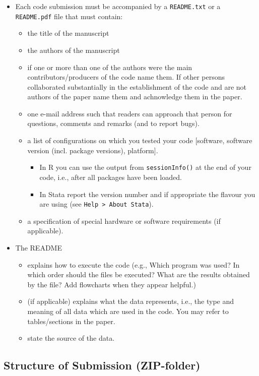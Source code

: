 \documentclass[12pt,a4paper]{article}
\begin{document}
\begin{itemize}
\item Each code submission {must} be accompanied by a \texttt{README.txt} or a
  \texttt{README.pdf} file that must contain:
  \begin{itemize}
  \item the title of the manuscript
  \item the authors of the manuscript
  \item if one or more than one of the authors were the main contributors/producers
    of the code name them. If other persons collaborated substantially in the
    establishment of the code and are not authors of the paper name them and
    achnowledge them in the paper.
  \item one e-mail address such that readers can approach that person for
    questions, comments and remarks (and to report bugs).
  \item a list of configurations on which you tested your code [software,
    software version (incl. package versions), platform].
    \begin{itemize}
    \item In \textsf{R} you can use the output from \texttt{sessionInfo()} at
      the end of your code, i.e., after all packages have been loaded.
    \item In \textsf{Stata} report the version number and if appropriate the
      flavour you are using (see \texttt{Help > About Stata}).
    \end{itemize}
  \item a specification of special hardware or software requirements (if
    applicable).
  \end{itemize}
  \item The README
  \begin{itemize}
  \item explains how to execute the code (e.g., Which program was used? In which
    order should the files be executed? What are the results obtained by the
    file? Add flowcharts when they appear helpful.)
  \item (if applicable) explains what the data represents, i.e., the type and
    meaning of all data which are used in the code. You may refer to
    tables/sections in the paper.
  \item state the source of the data.
  \end{itemize}
\end{itemize}

\subsection{Structure of Submission (ZIP-folder)}\label{sec:structure}
\end{document}
